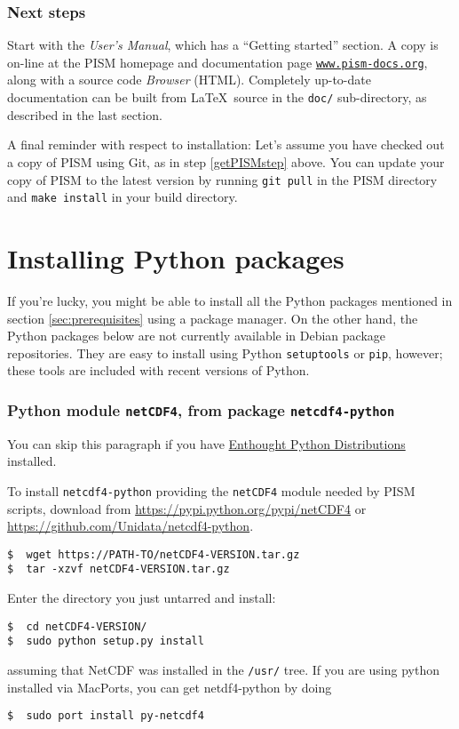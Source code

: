 \documentclass[titlepage,letterpaper,final]{scrartcl}
\begin{document}
\subsubsection*{Next steps}

Start with the \emph{User's Manual}, which has a ``Getting started'' section. A
copy is on-line at the PISM homepage and documentation page
\href{http://www.pism-docs.org/}{\texttt{www.pism-docs.org}}, along with a
source code \emph{Browser} (HTML). Completely up-to-date documentation can be
built from \LaTeX~source in the \texttt{doc/} sub-directory, as described in
the last section.

A final reminder with respect to installation: Let's assume you have checked
out a copy of PISM using Git, as in step \ref{getPISMstep} above. You can
update your copy of PISM to the latest version by running \texttt{git pull} in
the PISM directory and \texttt{make install} in your build directory.


\section{Installing Python packages}
\label{sec:python}

If you're lucky, you might be able to install all the Python packages mentioned
in section \ref{sec:prerequisites} using a package manager. On the other hand,
the Python packages below are not currently available in Debian package
repositories. They are easy to install using Python \texttt{setuptools} or \texttt{pip},
however; these tools are included with recent versions of Python.

\subsubsection*{Python module \texttt{netCDF4}, from package
  \texttt{netcdf4-python}}

You can skip this paragraph if you have
\href{http://www.enthought.com/}{Enthought Python Distributions} installed.

To install \texttt{netcdf4-python} providing the \texttt{netCDF4} module needed
by PISM scripts, download from \url{https://pypi.python.org/pypi/netCDF4} or
\url{https://github.com/Unidata/netcdf4-python}.

\begin{verbatim}
$  wget https://PATH-TO/netCDF4-VERSION.tar.gz
$  tar -xzvf netCDF4-VERSION.tar.gz
\end{verbatim}
Enter the directory you just untarred and install:
\begin{verbatim}
$  cd netCDF4-VERSION/
$  sudo python setup.py install
\end{verbatim}
assuming that NetCDF was installed in the \texttt{/usr/} tree. If you
are using python installed via MacPorts, you can get netdf4-python by doing
\begin{verbatim}
$  sudo port install py-netcdf4
\end{verbatim}
\end{document}
